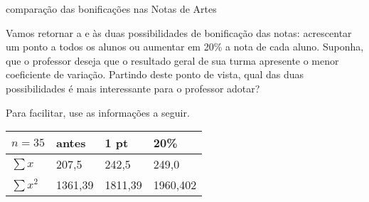 \begin{task}{comparação das bonificações nas Notas de Artes}

Vamos retornar a  e às duas possibilidades de bonificação das notas: acrescentar um ponto a todos os alunos ou aumentar em 20\% a nota de cada aluno. Suponha, que o professor deseja que o resultado geral de sua turma apresente o menor coeficiente de variação. Partindo deste ponto de vista, qual das duas possibilidades é mais interessante para o professor adotar?

Para facilitar, use as informações a seguir.


\begin{savenotes}\sphinxattablestart
\centering
{}
\label{\detokenize{PE104-5:id5}}
\sphinxaftercaption
\begin{tabulary}{\linewidth}[t]{|T|T|T|T|}
\hline

\(n=35\)
&
antes
&
1 pt
&
20\%
\\
\hline
\(\sum x\)
&
207,5
&
242,5
&
249,0
\\
\hline
\(\sum x^2\)
&
1361,39
&
1811,39
&
1960,402
\\
\hline
\end{tabulary}
\par
\sphinxattableend\end{savenotes}
\end{task}




\label{\detokenize{PE104-6::doc}}\label{\detokenize{PE104-6:explorando-boxplot}}\label{\detokenize{PE104-6:sec-explorando3}}


